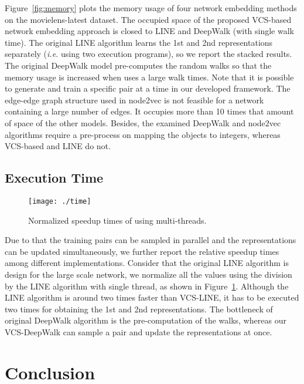 Figure~\ref{fig:memory} plots the memory usage of four network embedding methods on the movielens-latest dataset.  The occupied space of the proposed VCS-based network embedding approach is closed to LINE and DeepWalk (with single walk time).  The original LINE algorithm learns the 1st and 2nd representations separately (\textit{i.e.} using two execution programs), so we report the stacked results. The original DeepWalk model pre-computes the random walks so that the memory usage is increased when uses a large walk times. Note that it is possible to generate and train a specific pair at a time in our developed framework. The edge-edge graph structure used in node2vec is not feasible for a network containing a large number of edges.  It occupies more than 10 times that amount of space of the other models.  Besides, the examined DeepWalk and node2vec algorithms require a pre-process on mapping the objects to integers, whereas VCS-based and LINE do not.

\subsection{Execution Time}

\begin{figure}
\centering
\texttt{[image: ./time]}
\caption{Normalized speedup times of using multi-threads.}
\label{fig:time}
\end{figure}

Due to that the training pairs can be sampled in parallel and the representations can be updated simultaneously, we further report the relative speedup times among different implementations.  Consider that the original LINE algorithm is design for the large scale network, we normalize all the values using the division by the LINE algorithm with single thread, as shown in Figure~\ref{fig:time}.  Although the LINE algorithm is around two times faster than VCS-LINE, it has to be executed two times for obtaining the 1st and 2nd representations.  The bottleneck of original DeepWalk algorithm is the pre-computation of the walks, whereas our VCS-DeepWalk can sample a pair and update the representations at once. 


\section{Conclusion}
\label{sec_conclusion}

